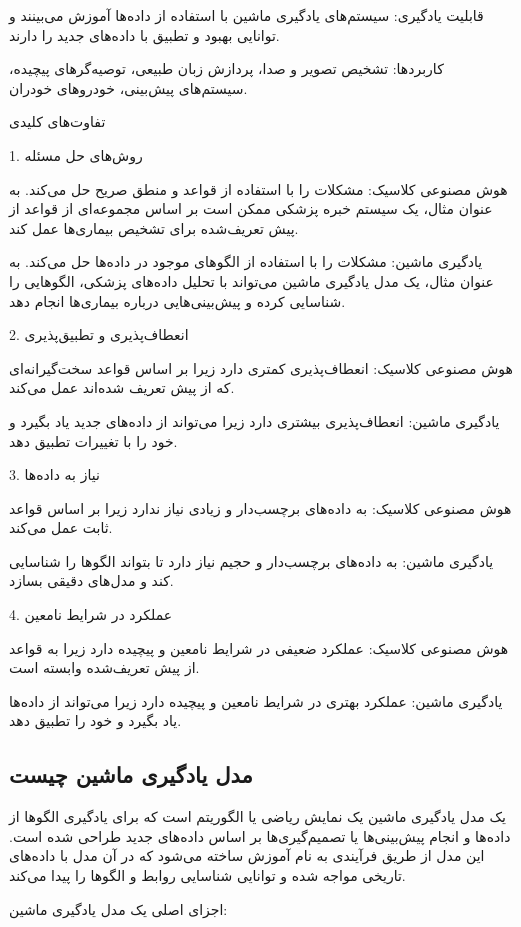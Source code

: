 \documentclass[a4paper, titlepage]{article}
\begin{document}
قابلیت یادگیری: سیستم‌های یادگیری ماشین با استفاده از داده‌ها آموزش می‌بینند و توانایی بهبود و تطبیق با داده‌های جدید را دارند.

کاربردها: تشخیص تصویر و صدا، پردازش زبان طبیعی، توصیه‌گرهای پیچیده، سیستم‌های پیش‌بینی، خودروهای خودران.

تفاوت‌های کلیدی

1. روش‌های حل مسئله

هوش مصنوعی کلاسیک: مشکلات را با استفاده از قواعد و منطق صریح حل می‌کند. به عنوان مثال، یک سیستم خبره پزشکی ممکن است بر اساس مجموعه‌ای از قواعد از پیش تعریف‌شده برای تشخیص بیماری‌ها عمل کند.

یادگیری ماشین: مشکلات را با استفاده از الگوهای موجود در داده‌ها حل می‌کند. به عنوان مثال، یک مدل یادگیری ماشین می‌تواند با تحلیل داده‌های پزشکی، الگوهایی را شناسایی کرده و پیش‌بینی‌هایی درباره بیماری‌ها انجام دهد.

2. انعطاف‌پذیری و تطبیق‌پذیری

هوش مصنوعی کلاسیک: انعطاف‌پذیری کمتری دارد زیرا بر اساس قواعد سخت‌گیرانه‌ای که از پیش تعریف شده‌اند عمل می‌کند.

یادگیری ماشین: انعطاف‌پذیری بیشتری دارد زیرا می‌تواند از داده‌های جدید یاد بگیرد و خود را با تغییرات تطبیق دهد.

3. نیاز به داده‌ها

هوش مصنوعی کلاسیک: به داده‌های برچسب‌دار و زیادی نیاز ندارد زیرا بر اساس قواعد ثابت عمل می‌کند.

یادگیری ماشین: به داده‌های برچسب‌دار و حجیم نیاز دارد تا بتواند الگوها را شناسایی کند و مدل‌های دقیقی بسازد.

4. عملکرد در شرایط نامعین

هوش مصنوعی کلاسیک: عملکرد ضعیفی در شرایط نامعین و پیچیده دارد زیرا به قواعد از پیش تعریف‌شده وابسته است.

یادگیری ماشین: عملکرد بهتری در شرایط نامعین و پیچیده دارد زیرا می‌تواند از داده‌ها یاد بگیرد و خود را تطبیق دهد.

\subsection{مدل یادگیری ماشین چیست}

یک مدل یادگیری ماشین یک نمایش ریاضی یا الگوریتم است که برای یادگیری الگوها از داده‌ها و انجام پیش‌بینی‌ها یا تصمیم‌گیری‌ها بر اساس داده‌های جدید طراحی شده است. این مدل از طریق فرآیندی به نام آموزش ساخته می‌شود که در آن مدل با داده‌های تاریخی مواجه شده و توانایی شناسایی روابط و الگوها را پیدا می‌کند.

اجزای اصلی یک مدل یادگیری ماشین:
\end{document}
